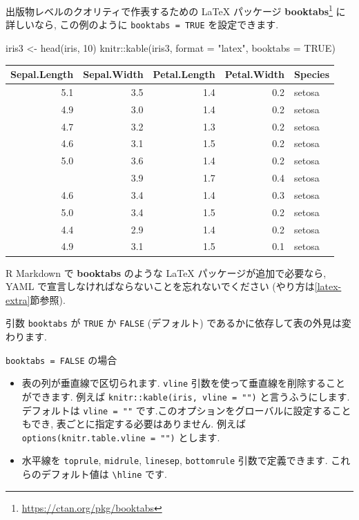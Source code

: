 \documentclass[
  11pt,
  lualatex,
  ja=standard]{bxjsreport}
\newenvironment{Shaded}{\begin{snugshade}}{\end{snugshade}}
\newcommand{\AttributeTok}[1]{\textcolor[rgb]{0.77,0.63,0.00}{#1}}
\newcommand{\ConstantTok}[1]{\textcolor[rgb]{0.00,0.00,0.00}{#1}}
\newcommand{\DecValTok}[1]{\textcolor[rgb]{0.00,0.00,0.81}{#1}}
\newcommand{\FunctionTok}[1]{\textcolor[rgb]{0.00,0.00,0.00}{#1}}
\newcommand{\NormalTok}[1]{#1}
\newcommand{\OtherTok}[1]{\textcolor[rgb]{0.56,0.35,0.01}{#1}}
\newcommand{\SpecialCharTok}[1]{\textcolor[rgb]{0.00,0.00,0.00}{#1}}
\newcommand{\StringTok}[1]{\textcolor[rgb]{0.31,0.60,0.02}{#1}}
\providecommand{\tightlist}{%
  \setlength{\itemsep}{0pt}\setlength{\parskip}{0pt}}
\renewcommand{\href}[2]{#2\footnote{\url{#1}}}
\begin{document}
出版物レベルのクオリティで作表するための LaTeX パッケージ \href{https://ctan.org/pkg/booktabs}{\textbf{booktabs}} に詳しいなら, この例のように \texttt{booktabs = TRUE} を設定できます.

\begin{Shaded}
\begin{Highlighting}[numbers=left,,]
\NormalTok{iris3 }\OtherTok{\textless{}{-}} \FunctionTok{head}\NormalTok{(iris, }\DecValTok{10}\NormalTok{)}
\NormalTok{knitr}\SpecialCharTok{::}\FunctionTok{kable}\NormalTok{(iris3, }\AttributeTok{format =} \StringTok{"latex"}\NormalTok{, }\AttributeTok{booktabs =} \ConstantTok{TRUE}\NormalTok{)}
\end{Highlighting}
\end{Shaded}

\begin{tabular}{rrrrl}
\toprule
Sepal.Length & Sepal.Width & Petal.Length & Petal.Width & Species\\
\midrule
5.1 & 3.5 & 1.4 & 0.2 & setosa\\
4.9 & 3.0 & 1.4 & 0.2 & setosa\\
4.7 & 3.2 & 1.3 & 0.2 & setosa\\
4.6 & 3.1 & 1.5 & 0.2 & setosa\\
5.0 & 3.6 & 1.4 & 0.2 & setosa\\
\addlinespace
5.4 & 3.9 & 1.7 & 0.4 & setosa\\
4.6 & 3.4 & 1.4 & 0.3 & setosa\\
5.0 & 3.4 & 1.5 & 0.2 & setosa\\
4.4 & 2.9 & 1.4 & 0.2 & setosa\\
4.9 & 3.1 & 1.5 & 0.1 & setosa\\
\bottomrule
\end{tabular}

R Markdown で \textbf{booktabs} のような LaTeX パッケージが追加で必要なら, YAML で宣言しなければならないことを忘れないでください (やり方は\ref{latex-extra}節参照).

引数 \texttt{booktabs} が \texttt{TRUE} か \texttt{FALSE} (デフォルト) であるかに依存して表の外見は変わります.

\texttt{booktabs = FALSE} の場合

\begin{itemize}
\tightlist
\item
  表の列が垂直線で区切られます. \texttt{vline} 引数を使って垂直線を削除することができます. 例えば \texttt{knitr::kable(iris, vline = "")} と言うふうにします. デフォルトは \texttt{vline = "\textbar{}"} です.このオプションをグローバルに設定することもでき, 表ごとに指定する必要はありません. 例えば \texttt{options(knitr.table.vline = "")} とします.
\item
  水平線を \texttt{toprule}, \texttt{midrule}, \texttt{linesep}, \texttt{bottomrule} 引数で定義できます. これらのデフォルト値は \texttt{\textbackslash{}hline} です.
\end{itemize}
\end{document}
